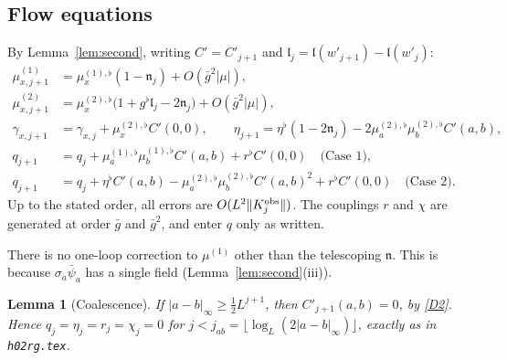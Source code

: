 \documentclass[11pt]{amsart}
\newtheorem{lemma}[theorem]{Lemma}
\theoremstyle{definition}
\theoremstyle{remark}
\numberwithin{equation}{section}
\newcommand{\hr}{\texttt{h02rg.tex}}
\begin{document}
\subsection{Flow equations}
By Lemma~\ref{lem:second}, writing $C'=C'_{j+1}$ and $\mathfrak l_j=\mathfrak l(w'_{j+1})-\mathfrak l(w'_j)$:
\begin{align*}
  \mu^{(1)}_{x,j+1}&=\mu^{(1),\flat}_x(1-\mathfrak n_j)+O(\bar g^2|\mu|),\\
  \mu^{(2)}_{x,j+1}&=\mu^{(2),\flat}_x\bigl(1+g^\flat\mathfrak l_j-2\mathfrak n_j\bigr)+O(\bar g^2|\mu|),\\
  \gamma_{x,j+1}&=\gamma_{x,j}+\mu^{(2),\flat}_xC'(0,0),\qquad
  \eta_{j+1}=\eta^\flat(1-2\mathfrak n_j)-2\mu^{(2),\flat}_a\mu^{(2),\flat}_bC'(a,b),\\
  q_{j+1}&=q_j+\mu^{(1),\flat}_a\mu^{(1),\flat}_bC'(a,b)+r^\flat C'(0,0)\quad\text{(Case 1)},\\
  q_{j+1}&=q_j+\eta^\flat C'(a,b)-\mu^{(2),\flat}_a\mu^{(2),\flat}_bC'(a,b)^2+r^\flat C'(0,0)\quad\text{(Case 2)}.
\end{align*}
Up to the stated order, all errors are $O(L^2\|K^{\rm obs}_j\|)$. The couplings $r$ and $\chi$
are generated at order $\bar g$ and $\bar g^2$, and enter $q$ only as written.

There is no one-loop correction to $\mu^{(1)}$ other than the telescoping $\mathfrak n$. This is
because $\sigma_a\bar\psi_a$ has a single field (Lemma~\ref{lem:second}(iii)).

\begin{lemma}[Coalescence]\label{lem:coal}
If $|a-b|_\infty\ge\frac12L^{j+1}$, then $C'_{j+1}(a,b)=0$, by \ref{D2}. Hence
$q_j=\eta_j=r_j=\chi_j=0$ for $j<j_{ab}=\lfloor\log_L(2|a-b|_\infty)\rfloor$, exactly as in \hr{}.
\end{lemma}
\end{document}
